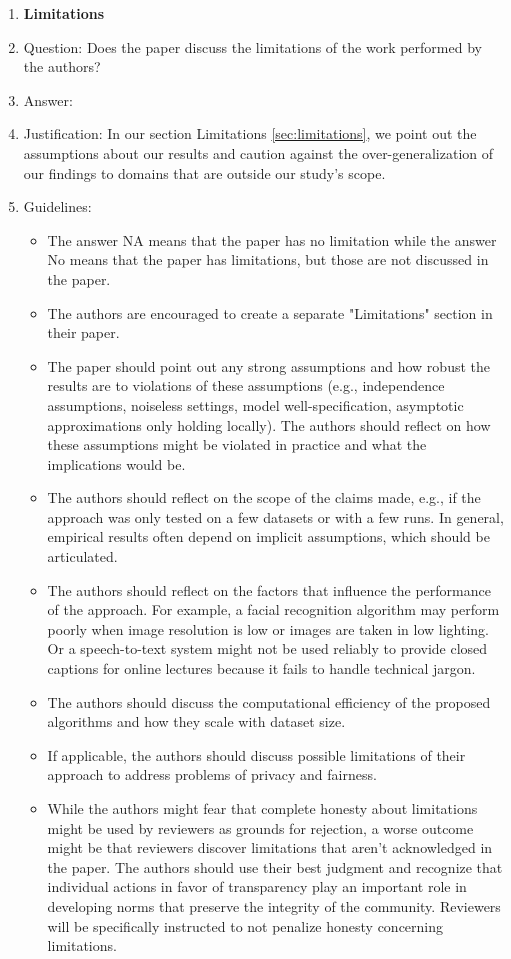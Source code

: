 \documentclass{article}
\begin{document}
\begin{enumerate}
\item {\bf Limitations}
    \item[] Question: Does the paper discuss the limitations of the work performed by the authors?
    \item[] Answer: \answerYes{} %
    \item[] Justification: In our section Limitations \ref{sec:limitations}, we point out the assumptions about our results and caution against the over-generalization of our findings to domains that are outside our study's scope.
    \item[] Guidelines:
    \begin{itemize}
        \item The answer NA means that the paper has no limitation while the answer No means that the paper has limitations, but those are not discussed in the paper. 
        \item The authors are encouraged to create a separate "Limitations" section in their paper.
        \item The paper should point out any strong assumptions and how robust the results are to violations of these assumptions (e.g., independence assumptions, noiseless settings, model well-specification, asymptotic approximations only holding locally). The authors should reflect on how these assumptions might be violated in practice and what the implications would be.
        \item The authors should reflect on the scope of the claims made, e.g., if the approach was only tested on a few datasets or with a few runs. In general, empirical results often depend on implicit assumptions, which should be articulated.
        \item The authors should reflect on the factors that influence the performance of the approach. For example, a facial recognition algorithm may perform poorly when image resolution is low or images are taken in low lighting. Or a speech-to-text system might not be used reliably to provide closed captions for online lectures because it fails to handle technical jargon.
        \item The authors should discuss the computational efficiency of the proposed algorithms and how they scale with dataset size.
        \item If applicable, the authors should discuss possible limitations of their approach to address problems of privacy and fairness.
        \item While the authors might fear that complete honesty about limitations might be used by reviewers as grounds for rejection, a worse outcome might be that reviewers discover limitations that aren't acknowledged in the paper. The authors should use their best judgment and recognize that individual actions in favor of transparency play an important role in developing norms that preserve the integrity of the community. Reviewers will be specifically instructed to not penalize honesty concerning limitations.
    \end{itemize}


\end{enumerate}
\end{document}
